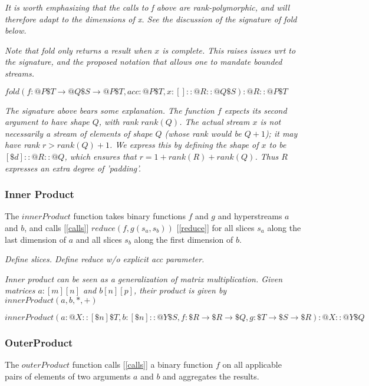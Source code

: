 \documentclass{article}
\begin{document}
{\em It is worth emphasizing that the calls to f above are rank-polymorphic, and will therefore adapt to the dimensions of x. See the discussion of the signature of fold below.
}

{\em Note that fold only returns a result when $x$ is complete.  This raises issues wrt to the signature, and  the proposed notation that allows one to mandate bounded streams.}

$fold(f: @P\$T \to{}@Q\$S \to{}@P\$T, acc: @P\$T, x:[]::@R::@Q \$S): @R::@P \$T $

{\em
The signature above bears some explanation. The function $f$ expects its second argument to have shape $Q$, with rank $rank(Q)$. The actual stream $x$ is not necessarily a stream of elements of shape $Q$ (whose rank would be $Q+1$); it may have rank $r \gt rank(Q) + 1$. We express this by defining the shape of $x$ to be $[\$d]::@R::@Q$, which ensures that $r = 1 + rank(R) + rank(Q)$. Thus $R$ expresses an extra degree of 'padding'.
}



\subsubsection{Inner Product}
\label{innerProduct}

The $innerProduct$ function takes binary functions $f$ and $g$ and hyperstreams $a$ and $b$, and calls [\ref{calls}] $reduce(f, g(s_a, s_b))$ [\ref{reduce}] for all slices $s_a$ along the last dimension of  $a$ and all slices  $s_b$ along the first dimension of $b$.

{\em Define slices. Define reduce w/o explicit acc parameter.}

{\em Inner product can be seen as a generalization of matrix multiplication.  Given matrices $a: [m][n]$ and $b[n][p]$, their product is given by
 $innerProduct(a, b, *, +)$

}

$innerProduct(a: @X:: [\$n]\$T, b: [\$n]::@Y\$S,  f: \$R \to \$R \to \$Q, g: \$T \to \$S \to \$R): @X::@Y\$Q$

\subsubsection{OuterProduct}
\label{outerProduct}

The $outerProduct$ function calls [\ref{calls}] a binary function $f$ on all applicable pairs of elements of two arguments $a$ and $b$ and aggregates the results.
\end{document}
